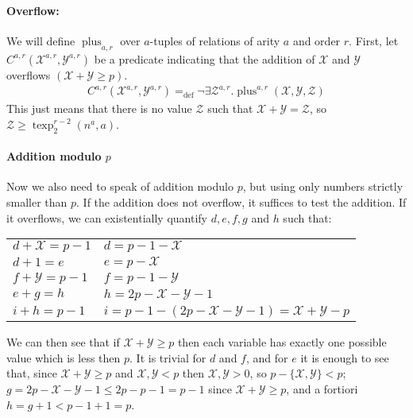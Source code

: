 \documentclass[a4paper,12pt]{article}
\theoremstyle{definition}
\DeclareMathOperator{\texp}{texp}
\DeclareMathOperator{\plu}{plus}
\newcommand{\mc}{\mathcal}
\newcommand{\ed}{=_{\mathrm{def}}}
\begin{document}
\paragraph{Overflow:}
We will define $\plu_{a,r}$ over $a$-tuples of relations of arity $a$
and order $r$. First, let $C^{a,r}(\mc X^{a,r},\mc Y^{a,r})$ be a
predicate indicating that the addition of $\mc X$ and $\mc Y$
overflows $(\mc{X+Y}\ge p)$.
\begin{eqnarray*}
  C^{a,r}(\mc X^{a,r},\mc Y^{a,r})\ed\neg\exists\mc Z^{a,r}.\plu^{a,r}(\mc{X,Y,Z})
\end{eqnarray*}
This just means that there is no value $\mc Z$ such that $\mc{X+Y=Z}$,
so $\mc {Z}\ge\texp_2^{r-2}(n^a,a)$.
\paragraph{Addition modulo $p$}
Now we also need to speak of addition modulo $p$, but using only
numbers strictly smaller than $p$.  If the addition does not overflow,
it suffices to test the addition. If it overflows, we can
existentially quantify $d, e,f,g$ and $h$ such that:

\begin{tabular}{ll}
  $d+\mc X=p-1$&$ d=p-1-\mc X$\\
  $d+1=e $&$ e=p-\mc X $ \\
  $f+\mc Y=p-1$&$ f=p-1-\mc Y$\\
$e+g=h $&$ h=2p-\mc X-\mc Y -1$ \\
  $i+h=p-1$&$ i=p-1-(2p-\mc X-\mc Y-1)=\mc X+\mc Y-p$\\
\end{tabular}

We can then see that if $\mc{X+Y}\ge p$ then each variable has exactly
one possible value which is less then $p$. It is trivial for $d$ and
$f$, and for $e$ it is enough to see that, since $\mc {X+Y}\ge p$ and $\mc
{X,Y}<p$ then $\mc{X,Y}>0$, so $p-\mc {\{X,Y\}}<p$; $g=2p-\mc X-\mc
Y-1\le2p-p-1=p-1$ since $\mc{X+Y}\ge p$, and a fortiori
$h=g+1<p-1+1=p$.
\end{document}
